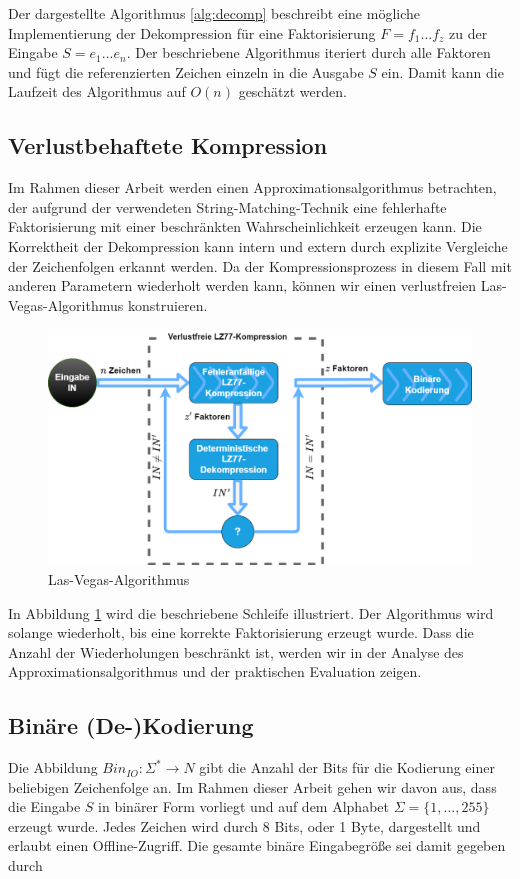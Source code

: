 Der dargestellte Algorithmus \ref{alg:decomp} beschreibt eine mögliche Implementierung der Dekompression für eine Faktorisierung $F=f_1...f_z$ zu der Eingabe $S=e_1...e_n$.
Der beschriebene Algorithmus iteriert durch alle Faktoren und fügt die referenzierten Zeichen einzeln in die Ausgabe $S$ ein. Damit kann die Laufzeit des Algorithmus auf $O(n)$
geschätzt werden.

\subsection{Verlustbehaftete Kompression}
Im Rahmen dieser Arbeit werden einen Approximationsalgorithmus betrachten, der aufgrund der verwendeten String-Matching-Technik eine fehlerhafte Faktorisierung mit einer 
beschränkten Wahrscheinlichkeit erzeugen kann. Die Korrektheit der Dekompression kann intern und extern durch explizite Vergleiche der Zeichenfolgen erkannt werden. Da der
Kompressionsprozess in diesem Fall mit anderen Parametern wiederholt werden kann, können wir einen verlustfreien Las-Vegas-Algorithmus konstruieren.

\begin{figure}
    \centering
    \caption{Las-Vegas-Algorithmus}
    \label{fig:lasvegas}
    \includegraphics[scale=0.25]{bilder/lasvegas_algorithm.png}
\end{figure}

In Abbildung \ref{fig:lasvegas} wird die beschriebene Schleife illustriert. Der Algorithmus wird solange wiederholt, bis eine korrekte Faktorisierung erzeugt wurde. Dass die
Anzahl der Wiederholungen beschränkt ist, werden wir in der Analyse des Approximationsalgorithmus und der praktischen Evaluation zeigen.

\subsection{Binäre (De-)Kodierung}
Die Abbildung $Bin_{IO}: \Sigma^* \rightarrow N$ gibt die Anzahl der Bits für die Kodierung einer beliebigen Zeichenfolge an. Im Rahmen dieser Arbeit gehen wir davon aus, dass die 
Eingabe $S$ in binärer Form vorliegt und auf dem Alphabet $\Sigma=\{1,...,255\}$ erzeugt wurde. Jedes Zeichen wird durch 8 Bits, oder 1 Byte, dargestellt und erlaubt einen 
Offline-Zugriff. Die gesamte binäre Eingabegröße sei damit gegeben durch 

